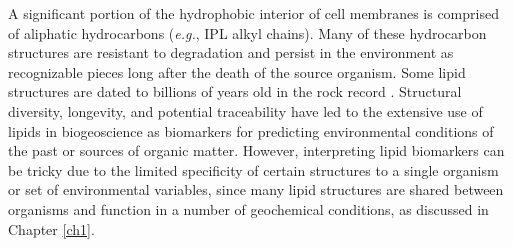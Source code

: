 
A significant portion of the hydrophobic interior of cell membranes is comprised of aliphatic hydrocarbons (\textit{e.g.}, IPL alkyl chains). Many of these hydrocarbon structures are resistant to degradation and persist in the environment as recognizable pieces long after the death of the source organism. Some lipid structures are dated to billions of years old in the rock record \citep{brocks2003composition, brocks2003reconstruction}. Structural diversity, longevity, and potential traceability have led to the extensive use of lipids in biogeoscience as biomarkers for predicting environmental conditions of the past or sources of organic matter. However, interpreting lipid biomarkers can be tricky due to the limited specificity of certain structures to a single organism or set of environmental variables, since many lipid structures are shared between organisms and function in a number of geochemical conditions, as discussed in Chapter \ref{ch1}.

